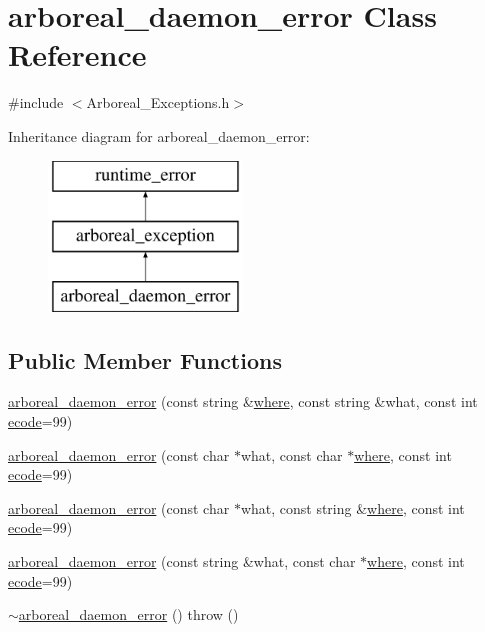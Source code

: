 \hypertarget{classarboreal__daemon__error}{}\section{arboreal\+\_\+daemon\+\_\+error Class Reference}
\label{classarboreal__daemon__error}


{\ttfamily \#include $<$Arboreal\+\_\+\+Exceptions.\+h$>$}

Inheritance diagram for arboreal\+\_\+daemon\+\_\+error\+:\begin{figure}[H]
\begin{center}
\leavevmode
\includegraphics[height=4.000000cm]{classarboreal__daemon__error}
\end{center}
\end{figure}
\subsection*{Public Member Functions}
\begin{DoxyCompactItemize}
\item 
\mbox{\hyperlink{classarboreal__daemon__error_aaa483ea710b1c20f37a61b7be7cd64fd}{arboreal\+\_\+daemon\+\_\+error}} (const string \&\mbox{\hyperlink{classarboreal__exception_a802003dee586aaeb0b0d7ce909da2dad}{where}}, const string \&what, const int \mbox{\hyperlink{classarboreal__exception_a318e716601c544d92ff9af25edebd725}{ecode}}=99)
\item 
\mbox{\hyperlink{classarboreal__daemon__error_a4a8b88442bf94bf88ffa162c8e8f76ef}{arboreal\+\_\+daemon\+\_\+error}} (const char $\ast$what, const char $\ast$\mbox{\hyperlink{classarboreal__exception_a802003dee586aaeb0b0d7ce909da2dad}{where}}, const int \mbox{\hyperlink{classarboreal__exception_a318e716601c544d92ff9af25edebd725}{ecode}}=99)
\item 
\mbox{\hyperlink{classarboreal__daemon__error_a32d6c4b31f97c709952f44e15fd6bf8a}{arboreal\+\_\+daemon\+\_\+error}} (const char $\ast$what, const string \&\mbox{\hyperlink{classarboreal__exception_a802003dee586aaeb0b0d7ce909da2dad}{where}}, const int \mbox{\hyperlink{classarboreal__exception_a318e716601c544d92ff9af25edebd725}{ecode}}=99)
\item 
\mbox{\hyperlink{classarboreal__daemon__error_adc8e08526e65a9707c55b674c8d02044}{arboreal\+\_\+daemon\+\_\+error}} (const string \&what, const char $\ast$\mbox{\hyperlink{classarboreal__exception_a802003dee586aaeb0b0d7ce909da2dad}{where}}, const int \mbox{\hyperlink{classarboreal__exception_a318e716601c544d92ff9af25edebd725}{ecode}}=99)
\item 
\mbox{\hyperlink{classarboreal__daemon__error_a0698eeeb4f23e3fdedd684503c3eddb3}{$\sim$arboreal\+\_\+daemon\+\_\+error}} ()  throw ()
\end{DoxyCompactItemize}
